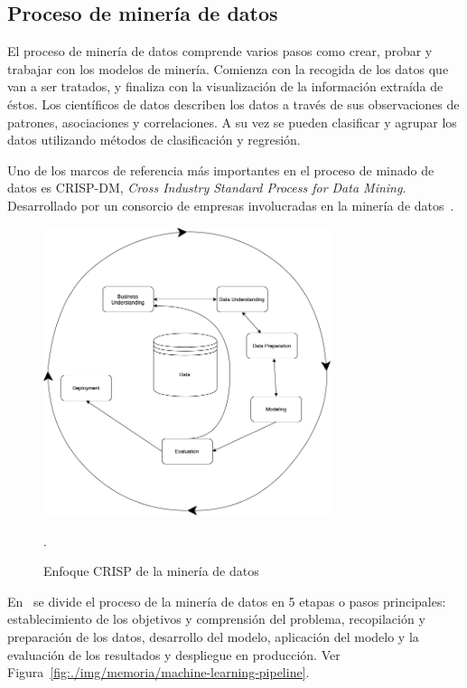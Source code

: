 \subsection{Proceso de minería de datos}
El proceso de minería de datos comprende varios pasos como crear, probar y trabajar con los modelos de minería. Comienza con la recogida de los datos que van a ser tratados, y finaliza con la visualización de la información extraída de éstos. 
Los científicos de datos describen los datos a través de sus observaciones de patrones, asociaciones y correlaciones. A su vez se pueden clasificar y agrupar los datos utilizando métodos de clasificación y regresión.

Uno de los marcos de referencia más importantes en el proceso de minado de datos es CRISP-DM, \textit{Cross Industry Standard Process for Data Mining}. Desarrollado por un consorcio de empresas involucradas en la minería de datos~\cite{Chapman2000CRISPDM1S}.

\begin{figure}
\centering
\includegraphics[width=0.75\textwidth]{./img/memoria/CRISP-DM}
\caption{Enfoque CRISP de la minería de datos~\cite{KOTU201517}}.
\label{./img/memoria/CRISP-DM}
\end{figure}

En~\cite{KOTU201517} se divide el proceso de la minería de datos en 5 etapas o pasos principales: establecimiento de los objetivos y comprensión del problema, recopilación y preparación de los datos, desarrollo del modelo, aplicación del modelo y la evaluación de los resultados y despliegue en producción. Ver Figura~\ref{fig:./img/memoria/machine-learning-pipeline}.

